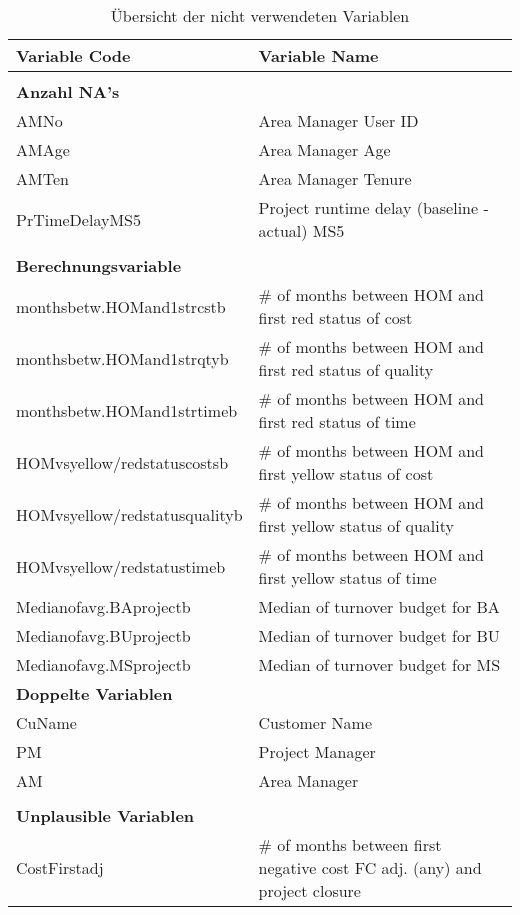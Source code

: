 \newpage
\begin{longtable}[ht]{p{} p{}}
	\caption{Übersicht der nicht verwendeten Variablen}\\
	\textbf{Variable Code} & \textbf{Variable Name} \\\hline\endhead
	& \\
	\textbf{Anzahl NA's} &  \\\hline
	AMNo  & Area Manager User ID \\
	AMAge & Area Manager Age \\
	AMTen & Area Manager Tenure \\
	PrTimeDelayMS5 & Project runtime delay (baseline - actual) MS5 \\
	&\\
	\textbf{Berechnungsvariable} &  \\\hline
	monthsbetw.HOMand1strcstb & \# of months between HOM and first red status of cost \\
	monthsbetw.HOMand1strqtyb & \# of months between HOM and first red status of quality \\
	monthsbetw.HOMand1strtimeb & \# of months between HOM and first red status of time \\
	HOMvsyellow/redstatuscostsb & \# of months between HOM and first yellow status of cost \\
	HOMvsyellow/redstatusqualityb & \# of months between HOM and first yellow status of quality \\
	HOMvsyellow/redstatustimeb & \# of months between HOM and first yellow status of time \\
	Medianofavg.BAprojectb & Median of turnover budget for BA \\
	Medianofavg.BUprojectb & Median of turnover budget for BU \\
	Medianofavg.MSprojectb & Median of turnover budget for MS \\
	\textbf{Doppelte Variablen} &  \\\hline
	CuName & Customer Name \\
	PM    & Project Manager \\
	AM    & Area Manager \\
	&\\
	\textbf{Unplausible Variablen} &  \\\hline
	CostFirstadj & \# of months between first negative cost FC adj. (any) and project closure \\

\end{longtable}
